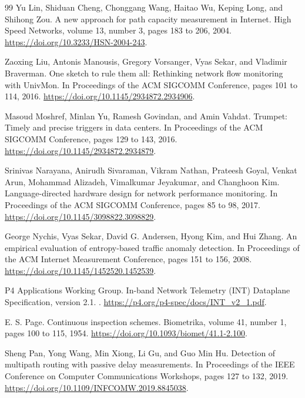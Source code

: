 \documentclass[a4paper,11pt]{report}
\begin{document}
\begin{thebibliography}{99}
Yu Lin, Shiduan Cheng, Chonggang Wang, Haitao Wu, Keping Long, and Shihong Zou.
\newblock A new approach for path capacity measurement in Internet.
\newblock High Speed Networks, volume 13, number 3, pages 183 to 206, 2004.
\newblock \url{https://doi.org/10.3233/HSN-2004-243}.

Zaoxing Liu, Antonis Manousis, Gregory Vorsanger, Vyas Sekar, and Vladimir Braverman.
\newblock One sketch to rule them all: Rethinking network flow monitoring with UnivMon.
\newblock In Proceedings of the ACM SIGCOMM Conference, pages 101 to 114, 2016.
\newblock \url{https://doi.org/10.1145/2934872.2934906}.

Masoud Moshref, Minlan Yu, Ramesh Govindan, and Amin Vahdat.
\newblock Trumpet: Timely and precise triggers in data centers.
\newblock In Proceedings of the ACM SIGCOMM Conference, pages 129 to 143, 2016.
\newblock \url{https://doi.org/10.1145/2934872.2934879}.

Srinivas Narayana, Anirudh Sivaraman, Vikram Nathan, Prateesh Goyal, Venkat Arun, Mohammad Alizadeh, Vimalkumar Jeyakumar, and Changhoon Kim.
\newblock Language-directed hardware design for network performance monitoring.
\newblock In Proceedings of the ACM SIGCOMM Conference, pages 85 to 98, 2017.
\newblock \url{https://doi.org/10.1145/3098822.3098829}.

George Nychis, Vyas Sekar, David G. Andersen, Hyong Kim, and Hui Zhang.
\newblock An empirical evaluation of entropy-based traffic anomaly detection.
\newblock In Proceedings of the ACM Internet Measurement Conference, pages 151 to 156, 2008.
\newblock \url{https://doi.org/10.1145/1452520.1452539}.

P4 Applications Working Group.
\newblock In-band Network Telemetry (INT) Dataplane Specification, version 2.1.
.
\newblock \url{https://p4.org/p4-spec/docs/INT_v2_1.pdf}.

E. S. Page.
\newblock Continuous inspection schemes.
\newblock Biometrika, volume 41, number 1, pages 100 to 115, 1954.
\newblock \url{https://doi.org/10.1093/biomet/41.1-2.100}.

Sheng Pan, Yong Wang, Min Xiong, Li Gu, and Guo Min Hu.
\newblock Detection of multipath routing with passive delay measurements.
\newblock In Proceedings of the IEEE Conference on Computer Communications Workshops, pages 127 to 132, 2019.
\newblock \url{https://doi.org/10.1109/INFCOMW.2019.8845038}.


\end{thebibliography}
\end{document}
